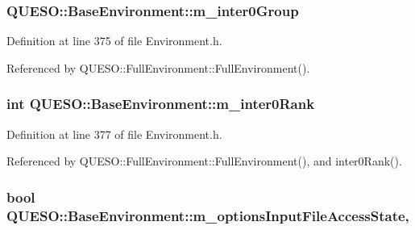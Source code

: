 \hypertarget{class_q_u_e_s_o_1_1_base_environment_aed2620ad6e42a86f2a5057a5cdcf99f5}{
\subsubsection[{m\-\_\-inter0\-Group}]{ Q\-U\-E\-S\-O\-::\-Base\-Environment\-::m\-\_\-inter0\-Group\hspace{0.3cm}{\ttfamily [protected]}}}\label{class_q_u_e_s_o_1_1_base_environment_aed2620ad6e42a86f2a5057a5cdcf99f5}


Definition at line 375 of file Environment.\-h.



Referenced by Q\-U\-E\-S\-O\-::\-Full\-Environment\-::\-Full\-Environment().

\hypertarget{class_q_u_e_s_o_1_1_base_environment_a1feb61fba41bc96f4913892df85e6853}{
\subsubsection[{m\-\_\-inter0\-Rank}]{\setlength{\rightskip}{0pt plus 5cm}int Q\-U\-E\-S\-O\-::\-Base\-Environment\-::m\-\_\-inter0\-Rank\hspace{0.3cm}{\ttfamily [protected]}}}\label{class_q_u_e_s_o_1_1_base_environment_a1feb61fba41bc96f4913892df85e6853}


Definition at line 377 of file Environment.\-h.



Referenced by Q\-U\-E\-S\-O\-::\-Full\-Environment\-::\-Full\-Environment(), and inter0\-Rank().

\hypertarget{class_q_u_e_s_o_1_1_base_environment_a48ea9a77af61344a313dfd7390b414b4}{
\subsubsection[{m\-\_\-options\-Input\-File\-Access\-State}]{\setlength{\rightskip}{0pt plus 5cm}bool Q\-U\-E\-S\-O\-::\-Base\-Environment\-::m\-\_\-options\-Input\-File\-Access\-State\hspace{0.3cm}{\ttfamily [mutable]}, {\ttfamily [protected]}}}\label{class_q_u_e_s_o_1_1_base_environment_a48ea9a77af61344a313dfd7390b414b4}


